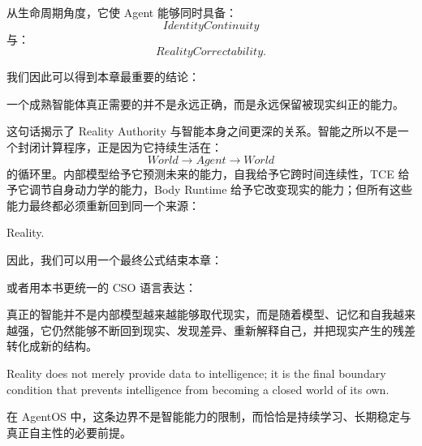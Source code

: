 从生命周期角度，它使 Agent 能够同时具备：
\[
IdentityContinuity
\]
与：
\[
RealityCorrectability.
\]

我们因此可以得到本章最重要的结论：

\begin{conclusion}
一个成熟智能体真正需要的并不是永远正确，而是永远保留被现实纠正的能力。
\end{conclusion}

这句话揭示了 Reality Authority 与智能本身之间更深的关系。智能之所以不是一个封闭计算程序，正是因为它持续生活在：
\[
World\rightarrow Agent\rightarrow World
\]
的循环里。内部模型给予它预测未来的能力，自我给予它跨时间连续性，TCE 给予它调节自身动力学的能力，Body Runtime 给予它改变现实的能力；但所有这些能力最终都必须重新回到同一个来源：

\begin{statementbox}
Reality.
\end{statementbox}

因此，我们可以用一个最终公式结束本章：

\begin{statementbox}
\centering
{}
\end{statementbox}

或者用本书更统一的 CSO 语言表达：

\begin{statementbox}
\centering
{}
\end{statementbox}

真正的智能并不是内部模型越来越能够取代现实，而是随着模型、记忆和自我越来越强，它仍然能够不断回到现实、发现差异、重新解释自己，并把现实产生的残差转化成新的结构。

\begin{statementbox}
Reality does not merely provide data to intelligence;
it is the final boundary condition that prevents intelligence from becoming a closed world of its own.
\end{statementbox}

在 AgentOS 中，这条边界不是智能能力的限制，而恰恰是持续学习、长期稳定与真正自主性的必要前提。
